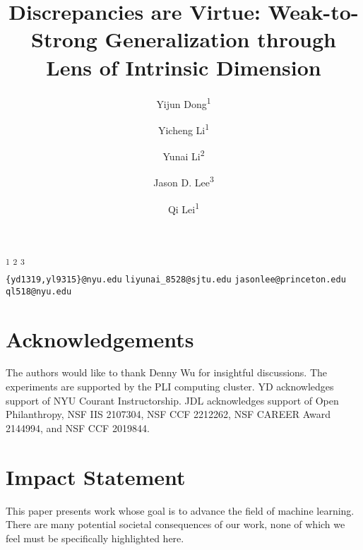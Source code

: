 \documentclass[12pt]{article}
\title{Discrepancies are Virtue: Weak-to-Strong Generalization through Lens of Intrinsic Dimension}
\author{%
Yijun Dong\textsuperscript{1} \and
Yicheng Li\textsuperscript{1} \and
Yunai Li\textsuperscript{2} \and
Jason D. Lee\textsuperscript{3} \and
Qi Lei\textsuperscript{1}
}
\date{}
\begin{document}
\maketitle
\vspace{-2em}
\begin{center}
    \textsuperscript{1} \quad
    \textsuperscript{2} \quad
    \textsuperscript{3}
    \vspace{2mm} \\
    \texttt{\{yd1319,yl9315\}@nyu.edu} \quad
    \texttt{liyunai\_8528@sjtu.edu} \quad
    \texttt{jasonlee@princeton.edu} \quad
    \texttt{ql518@nyu.edu}
    \vspace{2em}
\end{center}









\section*{Acknowledgements}
The authors would like to thank Denny Wu for insightful discussions. 
The experiments are supported by the PLI computing cluster.
YD acknowledges support of NYU Courant Instructorship.
JDL acknowledges support of Open Philanthropy, NSF IIS 2107304,  NSF CCF 2212262, NSF CAREER Award 2144994, and NSF CCF 2019844.


\section*{Impact Statement}
This paper presents work whose goal is to advance the field of machine learning. There are many potential societal consequences of our work, none of which we feel must be specifically highlighted here.





\end{document}
